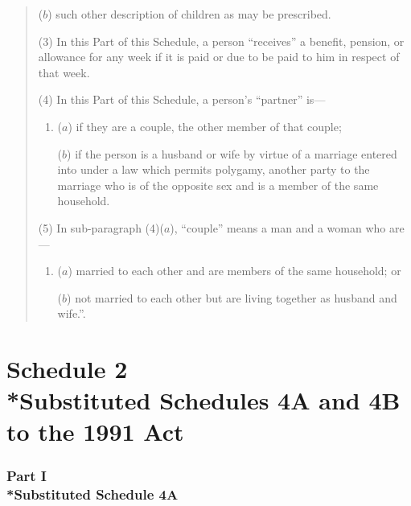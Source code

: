 \documentclass[12pt,a4paper]{article}
\begin{document}
\begin{quotation}
\begin{enumerate}
($b$) such other description of children as may be prescribed.
\end{enumerate}

(3) In this Part of this Schedule, a person “receives” a benefit, pension, or allowance for any week if it is paid or due to be paid to him in respect of that week.

(4) In this Part of this Schedule, a person’s “partner” is—
\begin{enumerate}\item[]
($a$) if they are a couple, the other member of that couple;

($b$) if the person is a husband or wife by virtue of a marriage entered into under a law which permits polygamy, another party to the marriage who is of the opposite sex and is a member of the same household.
\end{enumerate}

(5) In sub-paragraph (4)($a$), “couple” means a man and a woman who are—
\begin{enumerate}\item[]
($a$) married to each other and are members of the same household; or

($b$) not married to each other but are living together as husband and wife.”.
\end{enumerate}
\end{quotation}

\part[Schedule 2 --- Substituted Schedules 4A and 4B to the 1991 Act]{Schedule 2\\*Substituted Schedules 4A and 4B to the 1991 Act}

\renewcommand\parthead{--- Schedule 2 Part I}


\section[Part I --- Substituted Schedule 4A]{Part I\\*Substituted Schedule 4A}
\end{document}
